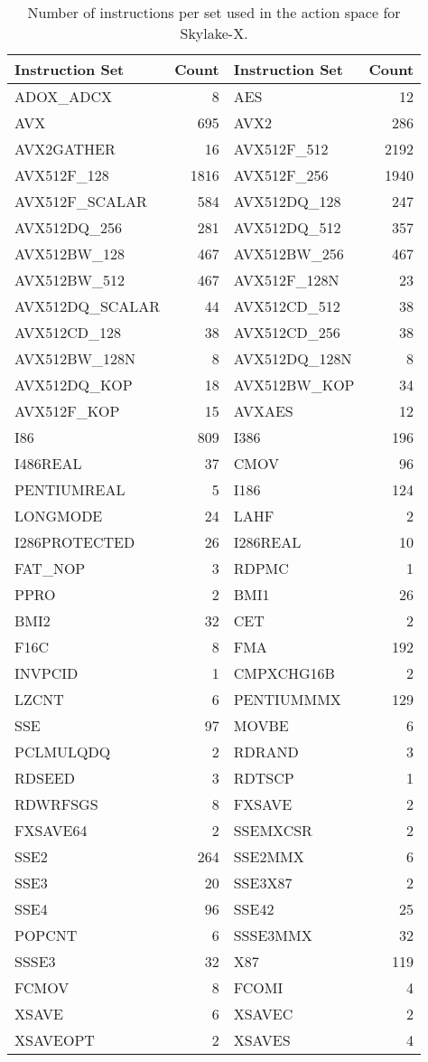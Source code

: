 \begin{table}[ht]
    \centering
    \footnotesize
    \begin{tabular}{|l|r|l|r|}
    \hline
    \textbf{Instruction Set} & \textbf{Count} & \textbf{Instruction Set} & \textbf{Count} \\
    \hline
    ADOX\_ADCX & 8 & AES & 12 \\
    AVX & 695 & AVX2 & 286 \\
    AVX2GATHER & 16 & AVX512F\_512 & 2192 \\
    AVX512F\_128 & 1816 & AVX512F\_256 & 1940 \\
    AVX512F\_SCALAR & 584 & AVX512DQ\_128 & 247 \\
    AVX512DQ\_256 & 281 & AVX512DQ\_512 & 357 \\
    AVX512BW\_128 & 467 & AVX512BW\_256 & 467 \\
    AVX512BW\_512 & 467 & AVX512F\_128N & 23 \\
    AVX512DQ\_SCALAR & 44 & AVX512CD\_512 & 38 \\
    AVX512CD\_128 & 38 & AVX512CD\_256 & 38 \\
    AVX512BW\_128N & 8 & AVX512DQ\_128N & 8 \\
    AVX512DQ\_KOP & 18 & AVX512BW\_KOP & 34 \\
    AVX512F\_KOP & 15 & AVXAES & 12 \\
    I86 & 809 & I386 & 196 \\
    I486REAL & 37 & CMOV & 96 \\
    PENTIUMREAL & 5 & I186 & 124 \\
    LONGMODE & 24 & LAHF & 2 \\
    I286PROTECTED & 26 & I286REAL & 10 \\
    FAT\_NOP & 3 & RDPMC & 1 \\
    PPRO & 2 & BMI1 & 26 \\
    BMI2 & 32 & CET & 2 \\
    F16C & 8 & FMA & 192 \\
    INVPCID & 1 & CMPXCHG16B & 2 \\
    LZCNT & 6 & PENTIUMMMX & 129 \\
    SSE & 97 & MOVBE & 6 \\
    PCLMULQDQ & 2 & RDRAND & 3 \\
    RDSEED & 3 & RDTSCP & 1 \\
    RDWRFSGS & 8 & FXSAVE & 2 \\
    FXSAVE64 & 2 & SSEMXCSR & 2 \\
    SSE2 & 264 & SSE2MMX & 6 \\
    SSE3 & 20 & SSE3X87 & 2 \\
    SSE4 & 96 & SSE42 & 25 \\
    POPCNT & 6 & SSSE3MMX & 32 \\
    SSSE3 & 32 & X87 & 119 \\
    FCMOV & 8 & FCOMI & 4 \\
    XSAVE & 6 & XSAVEC & 2 \\
    XSAVEOPT & 2 & XSAVES & 4 \\
    \hline
    \end{tabular}\label{tab:instruction_sets}
    \caption{Number of instructions per set used in the action space for Skylake-X.}
    \end{table}
